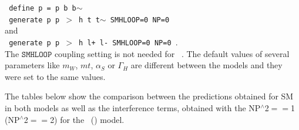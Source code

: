 \noindent
  \texttt{ define p = p b b$\sim$ }\\
  \texttt{ generate p p $>$ h t t$\sim$ SMHLOOP=0 NP=0 }\\
and \\ 
  \texttt{ generate p p $>$ h l+ l- SMHLOOP=0  NP=0     }.\\

  The $\texttt{SMHLOOP}$ coupling setting is not needed for \SMEFTatNLO\ . The default values of several parameters like $m_W$, $mt$, $\alpha_S$ or $\Gamma_{H}$ are different between the models and they were set to the same values.

  The tables below show the comparison between the predictions obtained for SM in both models as well as the interference terms, obtained with the NP$^{\wedge}$2$==$1 (NP$^{\wedge}$2$==$2)  for the \SMEFTsim\ (\SMEFTatNLO) model.


